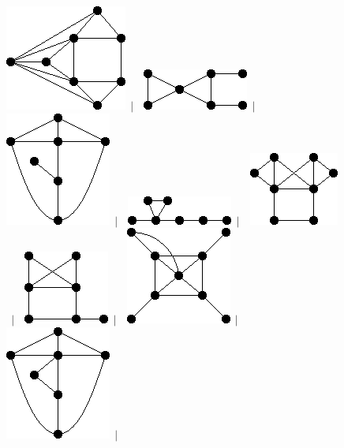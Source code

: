 \documentclass[11pt,paper=b5,footinclude,headinclude]{scrbook} %
\newtheorem{ex}{Vaja\hypertarget{sol:\theex}}[chapter]
\begin{document}
\begin{ex}
\begin{figure}
\includegraphics[scale=0.5]{smallGraphs/g_X120.png}$\,\mid\,$\
\includegraphics[scale=0.5]{smallGraphs/g_X127.png}$\,\mid\,$\
\includegraphics[scale=0.5]{smallGraphs/g_X13.png}$\,\mid\,$\
\includegraphics[scale=0.5]{smallGraphs/g_X130.png}$\,\mid\,$\
\includegraphics[scale=0.5]{smallGraphs/g_X131.png}$\,\mid\,$\
\includegraphics[scale=0.5]{smallGraphs/g_X132.png}$\,\mid\,$\
\includegraphics[scale=0.5]{smallGraphs/g_X139.png}$\,\mid\,$\
\includegraphics[scale=0.5]{smallGraphs/g_X14.png}$\,\mid\,$\

\end{figure}
\end{ex}
\end{document}

